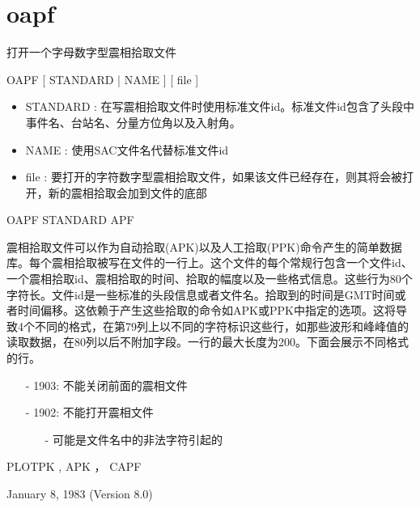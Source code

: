 \section{oapf}
\label{cmd:oapf}

打开一个字母数字型震相拾取文件

OAPF [ STANDARD | NAME ] [ file ]

\begin{itemize}
\item STANDARD : 在写震相拾取文件时使用标准文件id。标准文件id包含了头段中事件名、台站名、分量方位角以及入射角。 
\item NAME : 使用SAC文件名代替标准文件id 
\item file : 要打开的字符数字型震相拾取文件，如果该文件已经存在，则其将会被打开，新的震相拾取会加到文件的底部 
\end{itemize}

OAPF STANDARD APF

震相拾取文件可以作为自动拾取(APK)以及人工拾取(PPK)命令产生的简单数据库。每个震相拾取被写在文件的一行上。这个文件的每个常规行包含一个文件id、一个震相拾取id、震相拾取的时间、拾取的幅度以及一些格式信息。这些行为80个字符长。文件id是一些标准的头段信息或者文件名。拾取到的时间是GMT时间或者时间偏移。这依赖于产生这些拾取的命令如APK或PPK中指定的选项。这将导致4个不同的格式，在第79列上以不同的字符标识这些行，如那些波形和峰峰值的读取数据，在80列以后不附加字段。一行的最大长度为200。下面会展示不同格式的行。

\begin{itemize}
\item[-]1903: 不能关闭前面的震相文件
\item[-]1902: 不能打开震相文件
	\begin{itemize}
	\item[-]可能是文件名中的非法字符引起的
	\end{itemize}
\end{itemize}

PLOTPK , APK ， CAPF

January 8, 1983 (Version 8.0)

